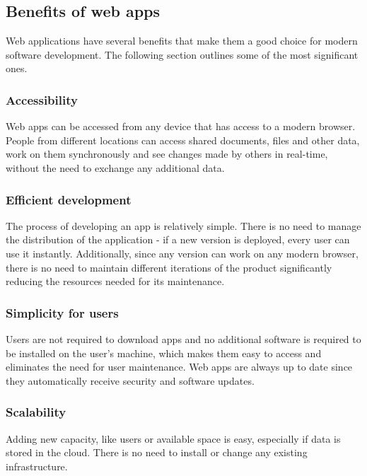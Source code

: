 \subsection{Benefits of web apps}

Web applications have several benefits that make them a good choice for modern software development. The following section outlines some of the most significant ones.

\subsubsection{Accessibility}

Web apps can be accessed from any device that has access to a modern browser. People from different locations can access shared documents, files and other data, work on them synchronously and see changes made by others in real-time, without the need to exchange any additional data.

\subsubsection{Efficient development}

The process of developing an app is relatively simple. There is no need to manage the distribution of the application - if a new version is deployed, every user can use it instantly. Additionally, since any version can work on any modern browser, there is no need to maintain different iterations of the product significantly reducing the resources needed for its maintenance.

\subsubsection{Simplicity for users}

Users are not required to download apps and no additional software is required to be installed on the user's machine, which makes them easy to access and eliminates the need for user maintenance. Web apps are always up to date since they automatically receive security and software updates.

\subsubsection{Scalability}

Adding new capacity, like users or available space is easy, especially if data is stored in the cloud. There is no need to install or change any existing infrastructure. \cite{aws_web_app}

